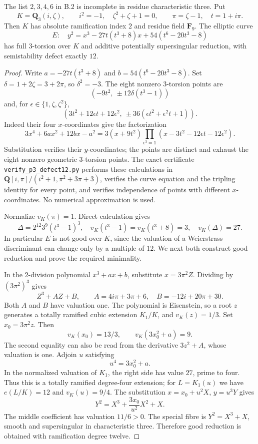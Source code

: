 \begin{theorem}\label{thm:B-RD8}
The list $2,3,4,6$ in B.2 is incomplete in residue characteristic three.
Put
\[
 K=\mathbf Q_3(i,\zeta),\qquad i^2=-1,\quad
 \zeta^2+\zeta+1=0,\qquad \pi=\zeta-1,\quad t=1+i\pi.
\]
Then $K$ has absolute ramification index $2$ and residue field
$\mathbf F_9$. The elliptic curve
\[
 E:\quad y^2=x^3-27t(t^3+8)x+54(t^6-20t^3-8)
\]
has full $3$-torsion over $K$ and additive potentially supersingular
reduction, with semistability defect exactly $12$.
\end{theorem}
\begin{proof}
Write $a=-27t(t^3+8)$ and $b=54(t^6-20t^3-8)$.
Set $\delta=1+2\zeta=3+2\pi$, so $\delta^2=-3$.
The eight nonzero $3$-torsion points are
\[
 \left(-9t^2,\ \pm12\delta(t^3-1)\right)
\]
and, for $\epsilon\in\{1,\zeta,\zeta^2\}$,
\[
 \left(3t^2+12\epsilon t+12\epsilon^2,
       \ \pm36(\epsilon t^2+\epsilon^2t+1)\right).
\]
Indeed their four $x$-coordinates give the factorization
\[
 3x^4+6ax^2+12bx-a^2
 =3(x+9t^2)\prod_{\epsilon^3=1}
       (x-3t^2-12\epsilon t-12\epsilon^2).
\]
Substitution verifies their $y$-coordinates; the points are distinct
and exhaust the eight nonzero geometric $3$-torsion points.
The exact certificate \texttt{verify\_p3\_defect12.py} performs these
calculations in
$\mathbf Q[i,\pi]/(i^2+1,\pi^2+3\pi+3)$, verifies the curve equation
and the tripling identity for every point, and verifies independence
of points with different $x$-coordinates. No numerical approximation
is used.

Normalize $v_K(\pi)=1$. Direct calculation gives
\[
 \Delta=2^{12}3^9(t^3-1)^3,\quad
 v_K(t^3-1)=v_K(t^3+8)=3,\quad v_K(\Delta)=27.
\]
In particular $E$ is not good over $K$, since the valuation of a
Weierstrass discriminant can change only by a multiple of $12$.
We next both construct good reduction and prove the required minimality.

In the $2$-division polynomial $x^3+ax+b$, substitute
$x=3\pi^2 Z$. Dividing by $(3\pi^2)^3$ gives
\[
 Z^3+A Z+B,
 \qquad A=4i\pi+3\pi+6,\quad B=-12i+20\pi+30.
\]
Both $A$ and $B$ have valuation one. The polynomial is Eisenstein,
so a root $z$ generates a totally ramified cubic extension $K_1/K$,
and $v_K(z)=1/3$. Set $x_0=3\pi^2 z$. Then
\[
 v_K(x_0)=13/3,\qquad v_K(3x_0^2+a)=9.
\]
The second equality can also be read from the derivative
$3z^2+A$, whose valuation is one. Adjoin $u$ satisfying
\[
 u^4=3x_0^2+a.
\]
In the normalized valuation of $K_1$, the right side has value $27$,
prime to four. Thus this is a totally ramified degree-four extension;
for $L=K_1(u)$ we have $e(L/K)=12$ and $v_K(u)=9/4$.
The substitution $x=x_0+u^2X$, $y=u^3Y$ gives
\[
 Y^2=X^3+\frac{3x_0}{u^2}X^2+X.
\]
The middle coefficient has valuation $11/6>0$. The special fibre is
$Y^2=X^3+X$, smooth and supersingular in characteristic three.
Therefore good reduction is obtained with ramification degree twelve.


\end{proof}
